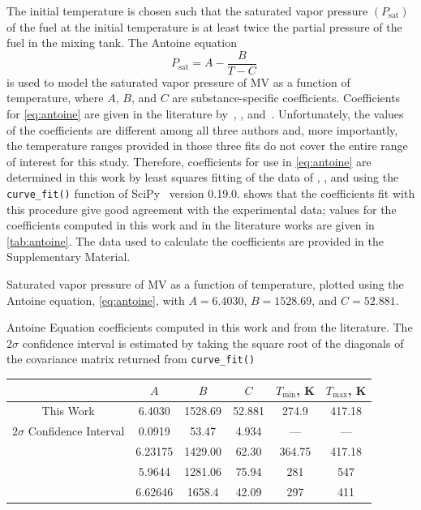 \documentclass[letterpaper, review]{elsarticle}
\newcommand*{\logten}{\mathop{\log_{10}}}
\begin{document}
The initial temperature is chosen such that the saturated vapor pressure \((P_{\text{sat}})\) of the
fuel at the initial temperature is at least twice the partial pressure of the fuel in the mixing
tank. The Antoine equation
%
\begin{equation}\label{eq:antoine}
    \logten{P_{\text{sat}}} = A - \frac{B}{T - C}
\end{equation}
%
is used to model the saturated vapor pressure of MV as a function of temperature, where \(A\),
\(B\), and \(C\) are substance-specific coefficients. Coefficients for \cref{eq:antoine} are given
in the literature by~\citet{Ortega2003}, \citet{Camacho2007}, and~\citet{Stephenson1987}.
Unfortunately, the values of the coefficients are different among all three authors and, more
importantly, the temperature ranges provided in those three fits do not cover the entire range of
interest for this study. Therefore, coefficients for use in \cref{eq:antoine} are determined in this
work by least squares fitting of the data of \citet{Ortega2003}, \citet{vanGenderen2002}, and
\citet{Verevkin2008} using the \verb|curve_fit()| function of SciPy~\cite{Jones2001} version 0.19.0.
 shows that the coefficients fit with this procedure give good agreement
with the experimental data; values for the coefficients computed in this work and in the literature
works are given in \cref{tab:antoine}. The data used to calculate the coefficients are provided in
the Supplementary Material.

\begin{center}
    \captionsetup{type=figure}
    
    \caption{Saturated vapor pressure of MV as a function of temperature,
    plotted using the Antoine equation, \cref{eq:antoine}, with
    \(A=6.4030\), \(B=1528.69\), and \(C=52.881\).}
    \label{fig:vapor-pressure}
\end{center}

\begin{center}
    \captionsetup{type=table}
    \caption{Antoine Equation coefficients computed in this work and from the
    literature. The $2\sigma$ confidence interval is estimated by taking the
    square root of the diagonals of the covariance matrix returned from
    \texttt{curve\_fit()}}
    \label{tab:antoine}
    \begin{tabular}{cccccc}
        \toprule
        & $A$ & $B$ & $C$ & $T_{\text{min}}$, \si{\K} & $T_{\text{max}}$, \si{\K} \\
        \midrule
        This Work & 6.4030 & 1528.69 & 52.881 & 274.9 & 417.18 \\
        $2\sigma$ Confidence Interval & 0.0919 & 53.47 & 4.934 & --- & --- \\
        \citet{Ortega2003} & 6.23175 & 1429.00 & 62.30 & 364.75 & 417.18 \\
        \citet{Camacho2007} & 5.9644 & 1281.06 & 75.94 & 281 & 547 \\
        \citet{Stephenson1987} & 6.62646 & 1658.4 & 42.09 & 297 & 411 \\
        \bottomrule
    \end{tabular}
\end{center}
\end{document}
